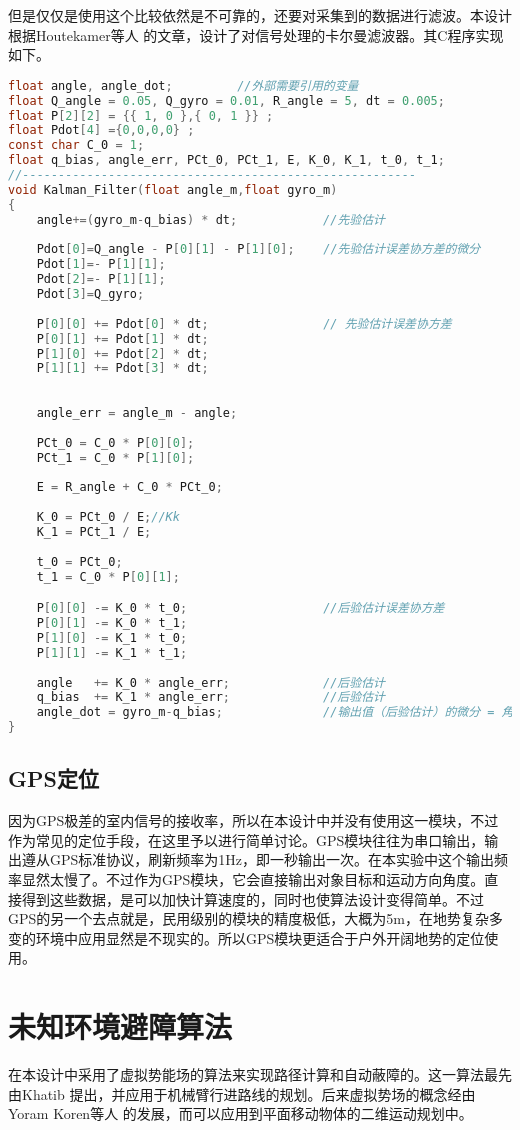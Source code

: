 但是仅仅是使用这个比较依然是不可靠的，还要对采集到的数据进行滤波。本设计根据Houtekamer等人 的文章，设计了对信号处理的卡尔曼滤波器。其C程序实现如下。
\begin{lstlisting}[language={C}, caption={Kalman滤波的C程序代码}]
float angle, angle_dot; 		//外部需要引用的变量
float Q_angle = 0.05, Q_gyro = 0.01, R_angle = 5, dt = 0.005;     
float P[2][2] = {{ 1, 0 },{ 0, 1 }} ;	
float Pdot[4] ={0,0,0,0} ;
const char C_0 = 1;
float q_bias, angle_err, PCt_0, PCt_1, E, K_0, K_1, t_0, t_1;
//-------------------------------------------------------
void Kalman_Filter(float angle_m,float gyro_m)			
{
	angle+=(gyro_m-q_bias) * dt;			//先验估计
	
	Pdot[0]=Q_angle - P[0][1] - P[1][0];	//先验估计误差协方差的微分
	Pdot[1]=- P[1][1];
	Pdot[2]=- P[1][1];
	Pdot[3]=Q_gyro;
	
	P[0][0] += Pdot[0] * dt;				// 先验估计误差协方差
	P[0][1] += Pdot[1] * dt;
	P[1][0] += Pdot[2] * dt;
	P[1][1] += Pdot[3] * dt;
	
	
	angle_err = angle_m - angle;			
	
	PCt_0 = C_0 * P[0][0];
	PCt_1 = C_0 * P[1][0];
	
	E = R_angle + C_0 * PCt_0;
	
	K_0 = PCt_0 / E;//Kk
	K_1 = PCt_1 / E;
	
	t_0 = PCt_0;
	t_1 = C_0 * P[0][1];

	P[0][0] -= K_0 * t_0;					//后验估计误差协方差
	P[0][1] -= K_0 * t_1;
	P[1][0] -= K_1 * t_0;
	P[1][1] -= K_1 * t_1;
	
	angle	+= K_0 * angle_err;				//后验估计
	q_bias	+= K_1 * angle_err;				//后验估计
	angle_dot = gyro_m-q_bias;				//输出值（后验估计）的微分 = 角速度
}
\end{lstlisting}
\subsection{GPS定位}
因为GPS极差的室内信号的接收率，所以在本设计中并没有使用这一模块，不过作为常见的定位手段，在这里予以进行简单讨论。GPS模块往往为串口输出，输出遵从GPS标准协议，刷新频率为1Hz，即一秒输出一次。在本实验中这个输出频率显然太慢了。不过作为GPS模块，它会直接输出对象目标和运动方向角度。直接得到这些数据，是可以加快计算速度的，同时也使算法设计变得简单。不过GPS的另一个去点就是，民用级别的模块的精度极低，大概为5m，在地势复杂多变的环境中应用显然是不现实的。所以GPS模块更适合于户外开阔地势的定位使用。
\section{未知环境避障算法}
在本设计中采用了虚拟势能场的算法来实现路径计算和自动蔽障的。这一算法最先由Khatib 提出，并应用于机械臂行进路线的规划。后来虚拟势场的概念经由Yoram Koren等人 的发展，而可以应用到平面移动物体的二维运动规划中。

